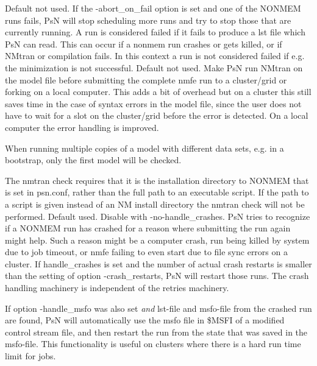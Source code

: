 \begin{optionlist}
Default not used. If the -abort\_on\_fail option is set and one of the NONMEM runs fails, PsN will stop scheduling more runs and try to stop those that are currently running. A run is considered failed if it fails to produce a lst file which PsN can read. This can occur if a nonmem run crashes or gets killed, or if NMtran or compilation fails. 
In this context a run is not considered failed if e.g. the minimization is not successful.  
\nextopt
{}
Default not used. 
Make PsN run NMtran on the model file before submitting the complete nmfe run to a cluster/grid or forking on a local computer. This adds a bit of overhead but on a cluster this still saves time in the case of syntax errors in the model file, since the user does not have to wait for a slot on the cluster/grid before the error is detected. On a local computer the error handling is improved.

When running multiple copies of a model with different data sets, e.g. in a bootstrap, only the first model will be checked. 

The nmtran check requires that it is the installation directory to NONMEM that is set in psn.conf, rather than the full path to an executable script. If the path to a script is given instead of an NM install directory the nmtran check will not be performed.
\nextopt
{}
Default used. Disable with -no-handle\_crashes. PsN tries to recognize if a NONMEM run has crashed for
a reason where submitting the run again might help. Such a reason might be
a computer crash, run being killed by system due to job timeout, or nmfe failing to even start due to file sync errors on a cluster.
If handle\_crashes is set and the number of actual crash restarts is smaller than the setting of option
-crash\_restarts, PsN will restart those runs. The crash handling machinery is independent of the retries machinery.

If option -handle\_msfo was also set \emph{and} lst-file and msfo-file from the crashed run are found, PsN will automatically use the
msfo file in \$MSFI of a modified control stream file, and then restart the run from the state that was saved in the msfo-file.
This functionality is useful on clusters where there is a hard run time limit for jobs.


\end{optionlist}
